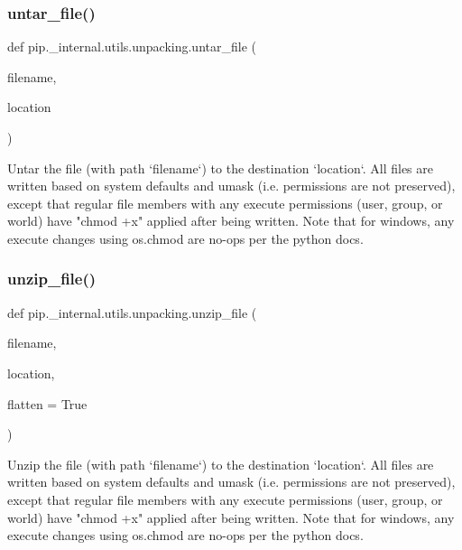 \subsubsection{\texorpdfstring{untar\+\_\+file()}{untar\_file()}}
{\footnotesize\ttfamily def pip.\+\_\+internal.\+utils.\+unpacking.\+untar\+\_\+file (\begin{DoxyParamCaption}\item[{}]{filename,  }\item[{}]{location }\end{DoxyParamCaption})}

\begin{DoxyVerb}Untar the file (with path `filename`) to the destination `location`.
All files are written based on system defaults and umask (i.e. permissions
are not preserved), except that regular file members with any execute
permissions (user, group, or world) have "chmod +x" applied after being
written.  Note that for windows, any execute changes using os.chmod are
no-ops per the python docs.
\end{DoxyVerb}
 \mbox{\label{namespacepip_1_1__internal_1_1utils_1_1unpacking_ac680d7976163e5e647a0e14958948bed}} 
\subsubsection{\texorpdfstring{unzip\+\_\+file()}{unzip\_file()}}
{\footnotesize\ttfamily def pip.\+\_\+internal.\+utils.\+unpacking.\+unzip\+\_\+file (\begin{DoxyParamCaption}\item[{}]{filename,  }\item[{}]{location,  }\item[{}]{flatten = {\ttfamily True} }\end{DoxyParamCaption})}

\begin{DoxyVerb}Unzip the file (with path `filename`) to the destination `location`.  All
files are written based on system defaults and umask (i.e. permissions are
not preserved), except that regular file members with any execute
permissions (user, group, or world) have "chmod +x" applied after being
written. Note that for windows, any execute changes using os.chmod are
no-ops per the python docs.
\end{DoxyVerb}
 \mbox{\label{namespacepip_1_1__internal_1_1utils_1_1unpacking_adbe68be28fbb02223e62d18869c3e0fb}} 

